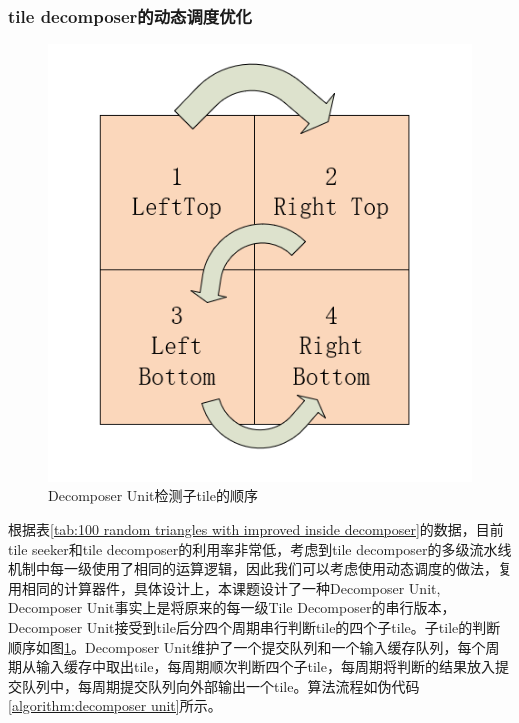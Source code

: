 \subsubsection{tile decomposer的动态调度优化}
\begin{figure}[H]
    \centering
    \includegraphics[width=.5\linewidth]{figure/decomposeunit.png}
    \caption{\label{fig:sub quad check order}Decomposer Unit检测子tile的顺序}
\end{figure}
根据表\ref{tab:100 random triangles with improved inside decomposer}的数据，目前tile seeker和tile decomposer的利用率非常低，考虑到tile decomposer的多级流水线机制中每一级使用了相同的运算逻辑，因此我们可以考虑使用动态调度的做法，复用相同的计算器件，具体设计上，本课题设计了一种Decomposer Unit, Decomposer Unit事实上是将原来的每一级Tile Decomposer的串行版本，Decomposer Unit接受到tile后分四个周期串行判断tile的四个子tile。子tile的判断顺序如图\ref{fig:sub quad check order}。Decomposer Unit维护了一个提交队列和一个输入缓存队列，每个周期从输入缓存中取出tile，每周期顺次判断四个子tile，每周期将判断的结果放入提交队列中，每周期提交队列向外部输出一个tile。算法流程如伪代码\ref{algorithm:decomposer unit}所示。



